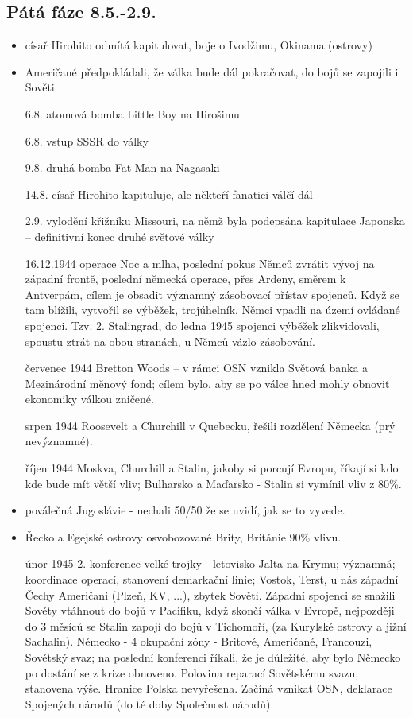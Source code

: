 \documentclass{article}
\begin{document}
\subsection*{Pátá fáze 8.5.-2.9.}
\begin{itemize}
    \item císař Hirohito odmítá kapitulovat, boje o Ivodžimu, Okinama (ostrovy)
    \item Američané předpokládali, že válka bude dál pokračovat, do bojů se zapojili i Sověti
    \item[6.8.] atomová bomba Little Boy na Hirošimu
    \item[6.8.] vstup SSSR do války
    \item[9.8.] druhá bomba Fat Man na Nagasaki
    \item[14.8.] císař Hirohito kapituluje, ale někteří fanatici válčí dál
    \item[2.9.] vylodění křižníku Missouri, na němž byla podepsána kapitulace Japonska -- definitivní konec druhé světové války
    \item[16.12.1944] operace Noc a mlha, poslední pokus Němců zvrátit vývoj na západní frontě, poslední německá operace, přes Ardeny, směrem k Antverpám, cílem je obsadit významný zásobovací přístav spojenců. Když se tam blížili, vytvořil se výběžek, trojúhelník, Němci vpadli na území ovládané spojenci. Tzv. 2. Stalingrad, do ledna 1945 spojenci výběžek zlikvidovali, spoustu ztrát na obou stranách, u Němců vázlo zásobování.
    \item[červenec 1944] Bretton Woods – v rámci OSN vznikla Světová banka a Mezinárodní měnový fond; cílem bylo, aby se po válce hned mohly obnovit ekonomiky válkou zničené.
    \item[srpen 1944]  Roosevelt a Churchill v Quebecku, řešili rozdělení Německa (prý nevýznamné).
    \item[říjen 1944]  Moskva, Churchill a Stalin, jakoby si porcují Evropu, říkají si kdo kde bude mít větší vliv; Bulharsko a Maďarsko - Stalin si vymínil vliv z 80\%.
    \item poválečná Jugoslávie - nechali 50/50 že se uvidí, jak se to vyvede.
    \item Řecko a Egejské ostrovy osvobozované Brity, Británie 90\% vlivu.
    \item[únor 1945] 2. konference velké trojky - letovisko Jalta na Krymu; významná; koordinace operací, stanovení demarkační linie; Vostok, Terst, u nás západní Čechy Američani (Plzeň, KV, ...), zbytek Sověti. Západní spojenci se snažili Sověty vtáhnout do bojů v Pacifiku, když skončí válka v Evropě, nejpozději do 3 měsíců se Stalin zapojí do bojů v Tichomoří, (za Kurylské ostrovy a jižní Sachalin). Německo - 4 okupační zóny - Britové, Američané, Francouzi, Sovětský svaz; na poslední konferenci říkali, že je důležité, aby bylo Německo po dostání se z krize obnoveno. Polovina reparací Sovětskému svazu, stanovena výše. Hranice Polska nevyřešena. Začíná vznikat OSN, deklarace Spojených národů (do té doby Společnost národů).
\end{itemize}
\end{document}
